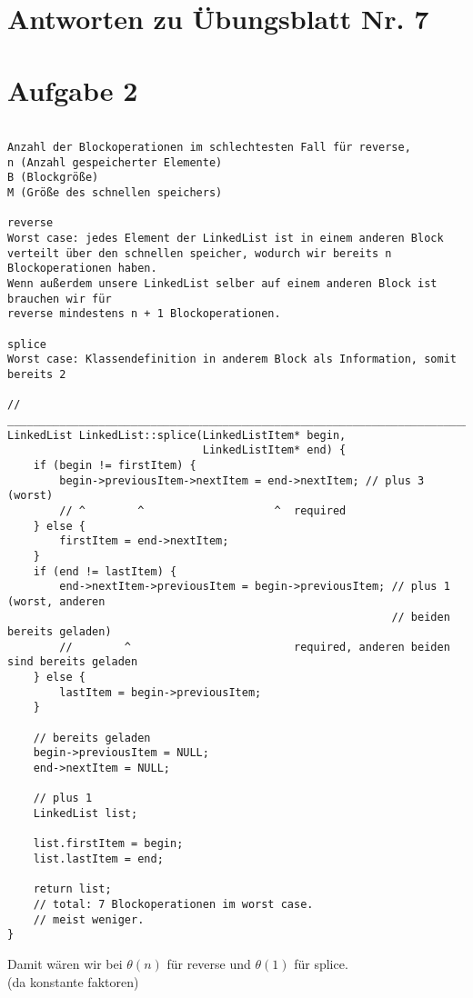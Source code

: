 \documentclass{scrartcl}
\begin{document}
\section*{Antworten zu Übungsblatt Nr. 7}

\section*{Aufgabe 2}

\begin{verbatim}

Anzahl der Blockoperationen im schlechtesten Fall für reverse,
n (Anzahl gespeicherter Elemente)
B (Blockgröße)
M (Größe des schnellen speichers)

reverse
Worst case: jedes Element der LinkedList ist in einem anderen Block
verteilt über den schnellen speicher, wodurch wir bereits n Blockoperationen haben.
Wenn außerdem unsere LinkedList selber auf einem anderen Block ist brauchen wir für
reverse mindestens n + 1 Blockoperationen.

splice
Worst case: Klassendefinition in anderem Block als Information, somit bereits 2

// _____________________________________________________________________________
LinkedList LinkedList::splice(LinkedListItem* begin,
                              LinkedListItem* end) {
    if (begin != firstItem) {
        begin->previousItem->nextItem = end->nextItem; // plus 3 (worst)
        // ^        ^                    ^  required
    } else {
        firstItem = end->nextItem;
    }
    if (end != lastItem) {
        end->nextItem->previousItem = begin->previousItem; // plus 1 (worst, anderen
                                                           // beiden bereits geladen)
        //        ^                         required, anderen beiden sind bereits geladen
    } else {
        lastItem = begin->previousItem;
    }

    // bereits geladen
    begin->previousItem = NULL;
    end->nextItem = NULL;

    // plus 1
    LinkedList list;

    list.firstItem = begin;
    list.lastItem = end;

    return list;
    // total: 7 Blockoperationen im worst case.
    // meist weniger.
}

\end{verbatim}

Damit wären wir bei $\theta(n)$ für reverse und $\theta(1)$ für splice. \\
(da konstante faktoren)
\end{document}
